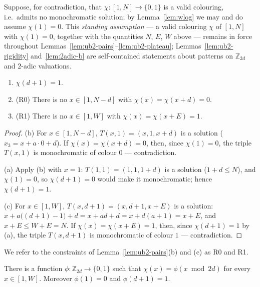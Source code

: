 Suppose, for contradiction, that $\chi \colon [1,N] \to \{0,1\}$ is a valid
colouring, i.e.\ admits no monochromatic solution; by
Lemma~\ref{lem:wlog} we may and do assume $\chi(1) = 0$. This
\emph{standing assumption} --- a valid colouring $\chi$ of $[1,N]$ with
$\chi(1) = 0$, together with the quantities $N$, $E$, $W$ above --- remains
in force throughout Lemmas~\ref{lem:ub2-pairs}--\ref{lem:ub2-plateau};
Lemmas~\ref{lem:ub2-rigidity} and~\ref{lem:2adic-b} are self-contained
statements about patterns on $\mathbb{Z}_{2d}$ and $2$-adic valuations.

\begin{lemma}\label{lem:ub2-pairs}
\begin{enumerate}
\item[(a)] $\chi(d+1) = 1$.
\item[(b)] (R0) There is no $x \in [1, N-d]$ with $\chi(x) = \chi(x+d) = 0$.
\item[(c)] (R1) There is no $x \in [1, W]$ with $\chi(x) = \chi(x+E) = 1$.
\end{enumerate}
\end{lemma}

\begin{proof}
(b) For $x \in [1, N-d]$, $T(x,1) = (x, 1, x+d)$ is a solution
($x_3 = x + a \cdot 0 + d$). If $\chi(x) = \chi(x+d) = 0$, then, since
$\chi(1) = 0$, the triple $T(x,1)$ is monochromatic of colour $0$ ---
contradiction.

(a) Apply (b) with $x = 1$: $T(1,1) = (1, 1, 1+d)$ is a solution
($1 + d \le N$), and $\chi(1) = 0$, so $\chi(d+1) = 0$ would make it
monochromatic; hence $\chi(d+1) = 1$.

(c) For $x \in [1, W]$, $T(x, d+1) = (x, d+1, x+E)$ is a solution:
$x + a\bigl((d+1)-1\bigr) + d = x + ad + d = x + d(a+1) = x + E$, and
$x + E \le W + E = N$. If $\chi(x) = \chi(x+E) = 1$, then, since
$\chi(d+1) = 1$ by (a), the triple $T(x, d+1)$ is monochromatic of colour
$1$ --- contradiction.
\end{proof}

We refer to the constraints of Lemma~\ref{lem:ub2-pairs}(b) and (c) as R0
and R1.

\begin{lemma}\label{lem:ub2-window}
There is a function $\phi \colon \mathbb{Z}_{2d} \to \{0,1\}$ such that
$\chi(x) = \phi(x \bmod 2d)$ for every $x \in [1, W]$. Moreover
$\phi(1) = 0$ and $\phi(d+1) = 1$.
\end{lemma}

